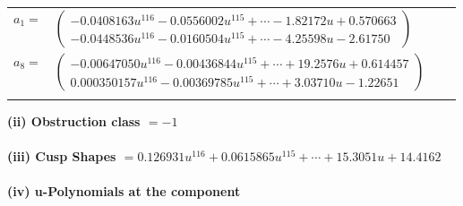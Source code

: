 \documentclass[1p]{elsarticle_modified}
\theoremstyle{definition}
\begin{document}
\begin{tabular}{m{7pt} m{180pt} m{7pt} m{180pt} }
\flushright $a_{1}=$&$\begin{pmatrix}-0.0408163 u^{116}-0.0556002 u^{115}+\cdots-1.82172 u+0.570663\\-0.0448536 u^{116}-0.0160504 u^{115}+\cdots-4.25598 u-2.61750\end{pmatrix}$ \\
\flushright $a_{8}=$&$\begin{pmatrix}-0.00647050 u^{116}-0.00436844 u^{115}+\cdots+19.2576 u+0.614457\\0.000350157 u^{116}-0.00369785 u^{115}+\cdots+3.03710 u-1.22651\end{pmatrix}$\\&\end{tabular}
\flushleft \textbf{(ii) Obstruction class $= -1$}\\~\\
\flushleft \textbf{(iii) Cusp Shapes $= 0.126931 u^{116}+0.0615865 u^{115}+\cdots+15.3051 u+14.4162$}\\~\\
\newpage\renewcommand{\arraystretch}{1}
\flushleft \textbf{(iv) u-Polynomials at the component}\newline \\
\end{document}
